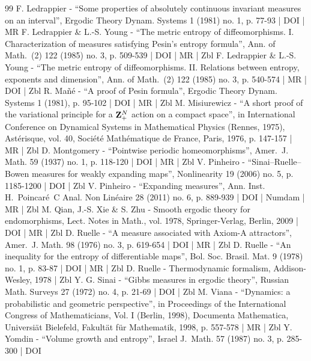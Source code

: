 \documentclass[10pt]{amsart}
\theoremstyle{definition}
\begin{document}
\begin{thebibliography}{99}
F. Ledrappier - “Some properties of absolutely continuous invariant measures on an interval”, Ergodic Theory Dynam. Systems 1 (1981) no. 1, p. 77-93 | DOI | MR
F. Ledrappier \& L.-S. Young - “The metric entropy of diffeomorphisms. I. Characterization of measures satisfying Pesin’s entropy formula”, Ann. of Math. (2) 122 (1985) no. 3, p. 509-539 | DOI | MR | Zbl
F. Ledrappier \& L.-S. Young - “The metric entropy of diffeomorphisms. II. Relations between entropy, exponents and dimension”, Ann. of Math. (2) 122 (1985) no. 3, p. 540-574 | MR | DOI | Zbl
R. Mañé - “A proof of Pesin formula”, Ergodic Theory Dynam. Systems 1 (1981), p. 95-102 | DOI | MR | Zbl
M. Misiurewicz - “A short proof of the variational principle for a ${\bf Z}_{+}^{N}$ action on a compact space”, in International Conference on Dynamical Systems in Mathematical Physics (Rennes, 1975), Astérisque, vol. 40, Société Mathématique de France, Paris, 1976, p. 147-157 | MR | Zbl
D. Montgomery - “Pointwise periodic homeomorphisms”, Amer. J. Math. 59 (1937) no. 1, p. 118-120 | DOI | MR | Zbl
V. Pinheiro - “Sinai–Ruelle–Bowen measures for weakly expanding maps”, Nonlinearity 19 (2006) no. 5, p. 1185-1200 | DOI | Zbl
V. Pinheiro - “Expanding measures”, Ann. Inst. H. Poincaré C Anal. Non Linéaire 28 (2011) no. 6, p. 889-939 | DOI | Numdam | MR | Zbl
M. Qian, J.-S. Xie \& S. Zhu - Smooth ergodic theory for endomorphisms, Lect. Notes in Math., vol. 1978, Springer-Verlag, Berlin, 2009 | DOI | MR | Zbl
D. Ruelle - “A measure associated with Axiom-A attractors”, Amer. J. Math. 98 (1976) no. 3, p. 619-654 | DOI | MR | Zbl
D. Ruelle - “An inequality for the entropy of differentiable maps”, Bol. Soc. Brasil. Mat. 9 (1978) no. 1, p. 83-87 | DOI | MR | Zbl
D. Ruelle - Thermodynamic formalism, Addison-Wesley, 1978 | Zbl
Y. G. Sinai - “Gibbs measures in ergodic theory”, Russian Math. Surveys 27 (1972) no. 4, p. 21-69 | DOI | Zbl
M. Viana - “Dynamics: a probabilistic and geometric perspective”, in Proceedings of the International Congress of Mathematicians, Vol. I (Berlin, 1998), Documenta Mathematica, Universiät Bielefeld, Fakultät für Mathematik, 1998, p. 557-578 | MR | Zbl
Y. Yomdin - “Volume growth and entropy”, Israel J. Math. 57 (1987) no. 3, p. 285-300 | DOI
\end{thebibliography}
\end{document}

